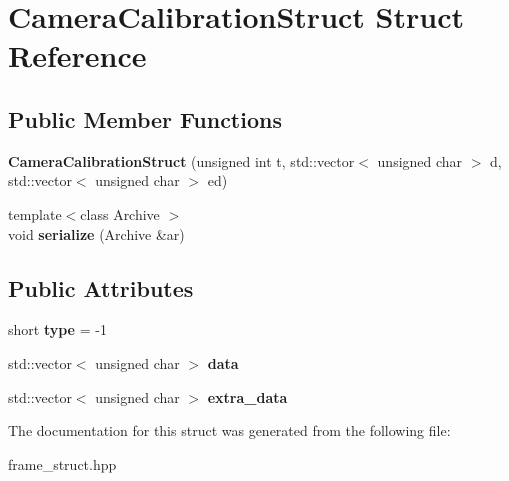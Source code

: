 \hypertarget{structCameraCalibrationStruct}{}\section{Camera\+Calibration\+Struct Struct Reference}
\label{structCameraCalibrationStruct}
\subsection*{Public Member Functions}
\begin{DoxyCompactItemize}
\item 
\mbox{\label{structCameraCalibrationStruct_a6709a273c62d05ff031bf7cd5548f76a}} 
{\bfseries Camera\+Calibration\+Struct} (unsigned int t, std\+::vector$<$ unsigned char $>$ d, std\+::vector$<$ unsigned char $>$ ed)
\item 
\mbox{\label{structCameraCalibrationStruct_af33ec03098f8fbc8f238bcee542dc323}} 
{\footnotesize template$<$class Archive $>$ }\\void {\bfseries serialize} (Archive \&ar)
\end{DoxyCompactItemize}
\subsection*{Public Attributes}
\begin{DoxyCompactItemize}
\item 
\mbox{\label{structCameraCalibrationStruct_a2f1fa117dc054f8f124ee177b8485b16}} 
short {\bfseries type} = -\/1
\item 
\mbox{\label{structCameraCalibrationStruct_af2e42fef306c56b59ed9f95d96629d0e}} 
std\+::vector$<$ unsigned char $>$ {\bfseries data}
\item 
\mbox{\label{structCameraCalibrationStruct_a51d6020141199452888bf75d9d349c3c}} 
std\+::vector$<$ unsigned char $>$ {\bfseries extra\+\_\+data}
\end{DoxyCompactItemize}


The documentation for this struct was generated from the following file\+:\begin{DoxyCompactItemize}
\item 
frame\+\_\+struct.\+hpp\end{DoxyCompactItemize}
